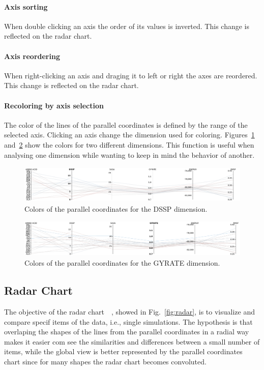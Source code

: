 \documentclass[10pt, conference]{IEEEtran}
\begin{document}
\paragraph*{Axis sorting} When double clicking an axis the order of its values is inverted. This change is reflected on the radar chart.
\paragraph*{Axis reordering} When right-clicking an axis and draging it to left or right the axes are reordered. This change is reflected on the radar chart.
\paragraph*{Recoloring by axis selection} The color of the lines of the parallel coordinates is defined by the range of the selected axis. Clicking an axis change the dimension used for coloring. Figures~\ref{fig:dssp} and~\ref{fig:gyrate} show the colors for two different dimensions. This function is useful when analysing one dimension while wanting to keep in mind the behavior of another.

\begin{figure}
\includegraphics[width=1.0\linewidth]{figs/dssp.png}
\caption{Colors of the parallel coordinates for the DSSP dimension.} 
\label{fig:dssp}
\end{figure}

\begin{figure}
\includegraphics[width=1.0\linewidth]{figs/gyrate.png}
\caption{Colors of the parallel coordinates for the GYRATE dimension.} 
\label{fig:gyrate}
\end{figure}

\subsection{Radar Chart}

The objective of the radar chart~\cite{saary2008radar}~\cite{mosley1999benchmarking}, showed in Fig.~\ref{fig:radar}, is to visualize and compare specif items of the data, i.e., single simulations. The hypothesis is that overlaping the shapes of the lines from the parallel coordinates in a radial way makes it easier com see the similarities and differences between a small number of items, while the global view is better represented by the parallel coordinates chart since for many shapes the radar chart becomes convoluted.  
\end{document}

